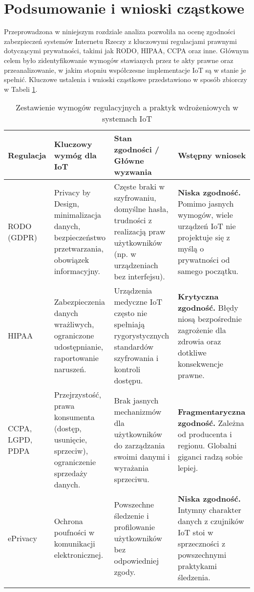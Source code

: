 \section{Podsumowanie i wnioski cząstkowe}
Przeprowadzona w niniejszym rozdziale analiza pozwoliła na ocenę zgodności zabezpieczeń systemów Internetu Rzeczy z kluczowymi regulacjami prawnymi dotyczącymi prywatności, takimi jak RODO, HIPAA, CCPA oraz inne. Głównym celem było zidentyfikowanie wymogów stawianych przez te akty prawne oraz przeanalizowanie, w jakim stopniu współczesne implementacje IoT są w stanie je spełnić.
Kluczowe ustalenia i wnioski cząstkowe przedstawiono w sposób zbiorczy w Tabeli \ref{tab:zgodnosc-regulacje}.
\begin{landscape}
\vspace*{2cm}
\renewcommand{\arraystretch}{1.3}
\setlength{\tabcolsep}{6pt}
\begin{table}[htbp]
\centering
\small
\caption{Zestawienie wymogów regulacyjnych a praktyk wdrożeniowych w systemach IoT}
\begin{tabular}{|p{3.5cm}|p{5.5cm}|p{7cm}|p{5.5cm}|}
\hline
\textbf{Regulacja} & \textbf{Kluczowy wymóg dla IoT} & \textbf{Stan zgodności / Główne wyzwania} & \textbf{Wstępny wniosek} \\
\hline
RODO (GDPR) 
& Privacy by Design, minimalizacja danych, bezpieczeństwo przetwarzania, obowiązek informacyjny. 
& Częste braki w szyfrowaniu, domyślne hasła, trudności z realizacją praw użytkowników (np. w urządzeniach bez interfejsu). 
& \textbf{Niska zgodność.} Pomimo jasnych wymogów, wiele urządzeń IoT nie projektuje się z myślą o prywatności od samego początku. \\
\hline
HIPAA 
& Zabezpieczenia danych wrażliwych, ograniczone udostępnianie, raportowanie naruszeń. 
& Urządzenia medyczne IoT często nie spełniają rygorystycznych standardów szyfrowania i kontroli dostępu. 
& \textbf{Krytyczna zgodność.} Błędy niosą bezpośrednie zagrożenie dla zdrowia oraz dotkliwe konsekwencje prawne. \\
\hline
CCPA, LGPD, PDPA 
& Przejrzystość, prawa konsumenta (dostęp, usunięcie, sprzeciw), ograniczenie sprzedaży danych. 
& Brak jasnych mechanizmów dla użytkowników do zarządzania swoimi danymi i wyrażania sprzeciwu. 
& \textbf{Fragmentaryczna zgodność.} Zależna od producenta i regionu. Globalni giganci radzą sobie lepiej. \\
\hline
ePrivacy 
& Ochrona poufności w komunikacji elektronicznej. 
& Powszechne śledzenie i profilowanie użytkowników bez odpowiedniej zgody. 
& \textbf{Niska zgodność.} Intymny charakter danych z czujników IoT stoi w sprzeczności z powszechnymi praktykami śledzenia. \\
\hline
\label{tab:zgodnosc-regulacje}
\end{tabular}
\end{table}
\end{landscape}

